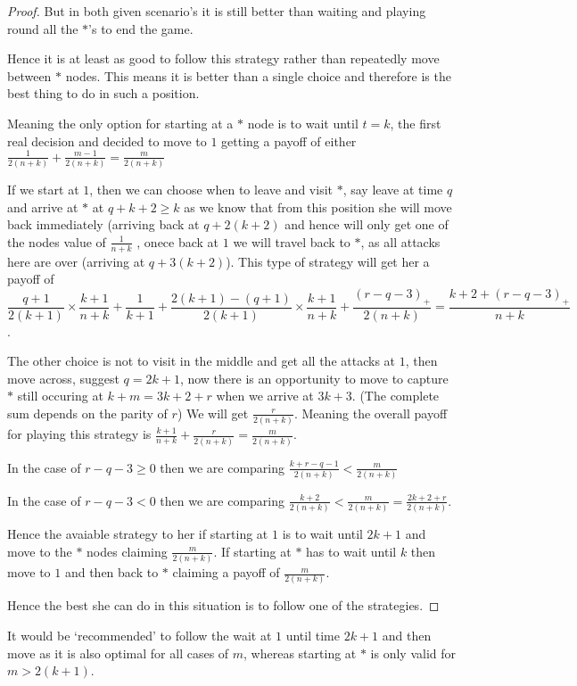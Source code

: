 \documentclass[a4paper,10pt]{article}
\newcommand{\pospart}[1]{\left( #1 \right)_{+}}
\theoremstyle{definition}
\theoremstyle{definition}
\theoremstyle{remark}
\theoremstyle{definition}
\begin{document}
\begin{proof}
But in both given scenario's it is still better than waiting and playing round all the  $*$'s to end the game.

Hence it is at least as good to follow this strategy rather than repeatedly move between $*$ nodes. This means it is better than a single choice and therefore is the best thing to do in such a position.

Meaning the only option for starting at a $*$ node is to wait until $t=k$, the first real decision and decided to move to $1$ getting a payoff of either
$\frac{1}{2(n+k)}+\frac{m-1}{2(n+k)}=\frac{m}{2(n+k)}$


If we start at $1$, then we can choose when to leave and visit $*$, say leave at time $q$ and arrive at $*$ at $q+k+2 \geq k$ as we know that from this position she will move back immediately (arriving back at $q+2(k+2)$ and hence will only get one of the nodes value of $\frac{1}{n+k}$ , onece back at $1$ we will travel back to $*$, as all attacks here are over (arriving at $q+3(k+2)$). This type of strategy will get her a payoff of
$$\frac{q+1}{2(k+1)} \times \frac{k+1}{n+k} +\frac{1}{k+1} +\frac{2(k+1)-(q+1)}{2(k+1)} \times \frac{k+1}{n+k} +\frac{\pospart{r-q-3}}{2(n+k)} =\frac{k+2+\pospart{r-q-3}}{n+k} $$.

The other choice is not to visit in the middle and get all the attacks at $1$, then move across, suggest $q=2k+1$, now there is an opportunity to move to capture $*$ still occuring at $k+m=3k+2+r$ when we arrive at $3k+3$. (The complete sum depends on the parity of $r$)
We will get $\frac{r}{2(n+k)}$.
Meaning the overall payoff for playing this strategy is $\frac{k+1}{n+k}+\frac{r}{2(n+k)}=\frac{m}{2(n+k)}$.

In the case of $r-q-3 \geq 0$ then we are comparing $\frac{k+r-q-1}{2(n+k)} < \frac{m}{2(n+k)}$

In the case of $r-q-3 < 0 $ then we are comparing $\frac{k+2}{2(n+k)} < \frac{m}{2(n+k)}=\frac{2k+2+r}{2(n+k)}$.

Hence the avaiable strategy to her if starting at $1$ is to wait until $2k+1$ and move to the $*$ nodes claiming $\frac{m}{2(n+k)}$. If starting at $*$ has to wait until $k$ then move to $1$ and then back to $*$ claiming a payoff of $\frac{m}{2(n+k)}$.

Hence the best she can do in this situation is to follow one of the strategies.  
\end{proof}

It would be `recommended' to follow the wait at $1$ until time $2k+1$ and then move as it is also optimal for all cases of $m$, whereas starting at $*$ is only valid for $m > 2(k+1)$. 
\end{document}
